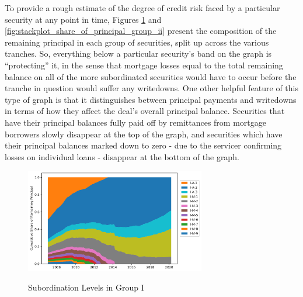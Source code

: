 \documentclass[12pt]{article}
\begin{document}
To provide a rough estimate of the degree of credit risk faced by a particular security at any point in time, Figures \ref{fig:stackplot_share_of_principal_group_i} and \ref{fig:stackplot_share_of_principal_group_ii} present the composition of the remaining principal in each group of securities, split up across the various tranches. So, everything below a particular security’s band on the graph is “protecting” it, in the sense that mortgage losses equal to the total remaining balance on all of the more subordinated securities would have to occur before the tranche in question would suffer any writedowns. One other helpful feature of this type of graph is that it distinguishes between principal payments and writedowns in terms of how they affect the deal’s overall principal balance. Securities that have their principal balances fully paid off by remittances from mortgage borrowers slowly disappear at the top of the graph, and securities which have their principal balances marked down to zero - due to the servicer confirming losses on individual loans - disappear at the bottom of the graph.


\begin{figure}[h]
	\centering
	\caption{Subordination Levels in Group I}
	\includegraphics[width=0.7\textwidth]{../figures/stackplot_share_of_principal_group_i}
	\label{fig:stackplot_share_of_principal_group_i}
\end{figure}
\end{document}
